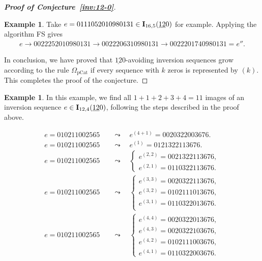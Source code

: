 \documentclass[12pt,A4]{amsart}
\numberwithin{equation}{section}
\theoremstyle{plain}
\theoremstyle{definition}
\newtheorem{example}[theorem]{Example}
\def\I{\operatorname{{\bf I}}}
\begin{document}
\begin{proof}[{\bf Proof of Conjecture~\ref{inv:12-0}}]
\begin{framed}
\begin{example} Take $e=0111052010980131\in\I_{16,5}(\underline{12}0)$  for example. Applying  the algorithm FS gives
\begin{align*}
e\rightarrow 0022252010980131\rightarrow 0022206310980131\rightarrow0022201740980131=e''.
\end{align*}
\end{example}
\end{framed}

In conclusion, we have proved that $\underline{12}0$-avoiding inversion sequences grow according to  the rule $\Omega_{\mathrm{pCat}}$ if every sequence with $k$ zeros is represented by $(k)$. This completes the proof of the conjecture. 
\end{proof}

\begin{example}\label{eg-algorithm}
In this example, we find all $1+1+2+3+4=11$ images of an inversion sequence $e\in\I_{12,4}(\underline{12}0)$, following the steps described in the proof above. 

\begin{align*}
e=010211002565\quad &\leadsto \quad e^{(4+1)}=0020322003676. \\
e=010211002565\quad &\leadsto \quad e^{(1)}=0121322113676. \\
e=010211002565\quad &\leadsto \quad \begin{cases}e^{(2,2)}=0021322113676, \\ e^{(2,1)}=0110322113676.\end{cases}\\
e=010211002565\quad &\leadsto \quad \begin{cases}e^{(3,3)}=0020322113676, \\ e^{(3,2)}=0102111013676, \\ e^{(3,1)}=0110322013676. \\ \end{cases}\\
e=010211002565\quad &\leadsto \quad \begin{cases}e^{(4,4)}=0020322013676, \\ e^{(4,3)}=0020322103676, \\ e^{(4,2)}=0102111003676, \\ e^{(4,1)}=0110322003676. \end{cases}

\end{align*}
\end{example}
\end{document}
